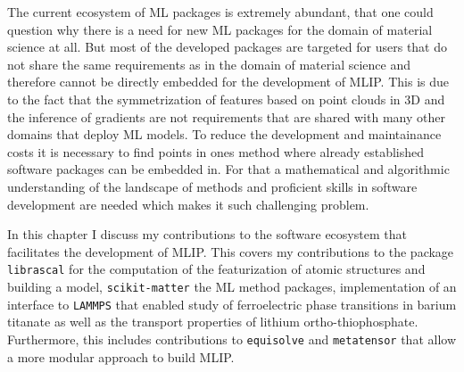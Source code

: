 The current ecosystem of ML packages is extremely abundant, that one could question why there is a need for new ML packages for the domain of material science at all.
But most of the developed packages are targeted for users that do not share the same requirements as in the domain of material science and therefore cannot be directly embedded for the development of MLIP.
This is due to the fact that the symmetrization of features based on point clouds in 3D
 and the inference of gradients are not requirements that are shared with many other domains that deploy ML models.
To reduce the development and maintainance costs it is necessary to find points in ones method where already established software packages can be embedded in.
For that a mathematical and algorithmic understanding of the landscape of methods and proficient skills in software development are needed which makes it such challenging problem.

In this chapter I discuss my contributions to the software ecosystem that facilitates the development of MLIP.
This covers my contributions to the package \texttt{librascal} for the computation of the featurization of atomic structures and building a model, \texttt{scikit-matter} the ML method packages, implementation of an interface to \texttt{LAMMPS} that enabled study of ferroelectric phase transitions in barium titanate\cite{gigli2023modeling} as well as the transport properties of lithium ortho-thiophosphate\cite{gigli2023mechanism}.
Furthermore, this includes contributions to \texttt{equisolve} and \texttt{metatensor} that allow a more modular approach to build MLIP.

